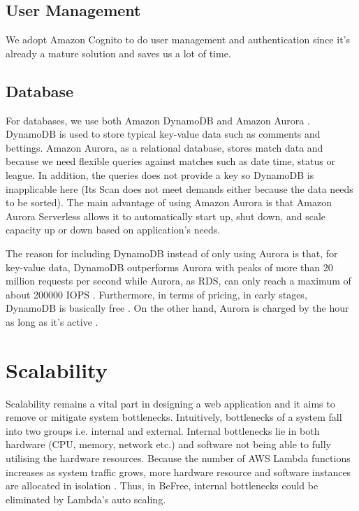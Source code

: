 \documentclass[conference]{IEEEtran}
\begin{document}
\subsection{User Management}
We adopt Amazon Cognito \cite{b8} to do user management and authentication since it's already a mature solution and saves us a lot of time.

\subsection{Database}
For databases, we use both Amazon DynamoDB \cite{b9} and Amazon Aurora \cite{b10}. DynamoDB is used to store typical key-value data such as comments and bettings. Amazon Aurora, as a relational database, stores match data and because we need flexible queries against matches such as date time, status or league. In addition, the queries does not provide a key so DynamoDB is inapplicable here (Its Scan does not meet demands either because the data needs to be sorted). The main advantage of using Amazon Aurora is that Amazon Aurora Serverless \cite{b11} allows it to automatically start up, shut down, and scale capacity up or down based on application's needs.

The reason for including DynamoDB instead of only using Aurora is that, for key-value data, DynamoDB outperforms Aurora with peaks of more than 20 million requests per second \cite{b9} while Aurora, as RDS, can only reach a maximum of about 200000 IOPS \cite{b12} \cite{b13}. Furthermore, in terms of pricing, in early stages, DynamoDB is basically free \cite{b14}. On the other hand, Aurora is charged by the hour as long as it's active \cite{b15}.

\section{Scalability}
Scalability remains a vital part in designing a web application and it aims to remove or mitigate system bottlenecks. Intuitively, bottlenecks of a system fall into two groups i.e. internal and external. Internal bottlenecks lie in both hardware (CPU, memory, network etc.) and software not being able to fully utilising the hardware resources. Because the number of AWS Lambda functions increases as system traffic grows, more hardware resource and software instances are allocated in isolation \cite{b14}. Thus, in BeFree, internal bottlenecks could be eliminated by Lambda's auto scaling.
\end{document}

